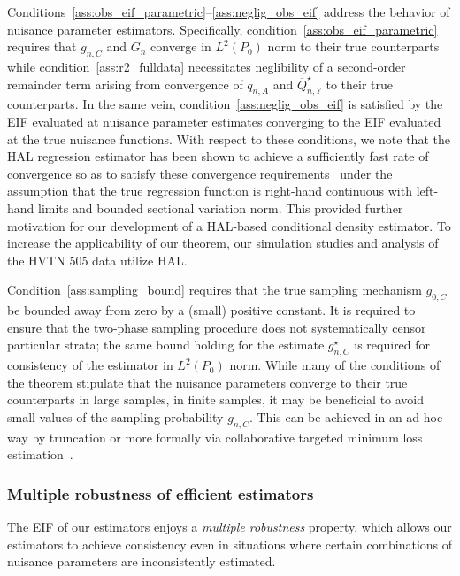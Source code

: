 Conditions~\ref{ass:obs_eif_parametric}--\ref{ass:neglig_obs_eif}
address the behavior of nuisance parameter estimators. Specifically,
condition~\ref{ass:obs_eif_parametric} requires that $g_{n,C}$ and $G_n$
converge in $L^2(P_0)$ norm to their true counterparts while
condition~\ref{ass:r2_fulldata} necessitates neglibility of a second-order
remainder term arising from convergence of $q_{n,A}$ and
$\overline{Q}^{\star}_{n,Y}$ to their true counterparts. In the same vein,
condition~\ref{ass:neglig_obs_eif} is satisfied by the EIF evaluated at
nuisance parameter estimates converging to the EIF evaluated at the true
nuisance functions. With respect to these conditions, we note that the HAL
regression estimator has been shown to achieve a sufficiently fast rate of
convergence so as to satisfy these convergence
requirements~\citep{vdl2017generally, bibaut2019fast} under the assumption that
the true regression function is right-hand continuous with left-hand limits and
bounded sectional variation norm. This provided further motivation for our
development of a HAL-based conditional density estimator. To increase the
applicability of our theorem, our simulation studies and analysis of the HVTN
505 data utilize HAL.

Condition~\ref{ass:sampling_bound} requires that the true sampling
mechanism $g_{0,C}$ be bounded away from zero by a (small) positive constant. It
is required to ensure that the two-phase sampling procedure does not
systematically censor particular strata; the same bound holding for the estimate
$g^{\star}_{n,C}$ is required for consistency of the estimator in $L^2(P_0)$
norm. While many of the conditions of the theorem stipulate that the nuisance
parameters converge to their true counterparts in large samples, in finite
samples, it may be beneficial to avoid small values of the sampling probability
$g_{n,C}$. This can be achieved in an ad-hoc way by truncation or more formally
via collaborative targeted minimum loss estimation~\citep{vdl2010collaborative}.

\subsubsection{Multiple robustness of efficient estimators}\label{mult_robust}

The EIF of our estimators enjoys a \textit{multiple robustness} property, which
allows our estimators to achieve consistency even in situations where certain
combinations of nuisance parameters are inconsistently estimated.


